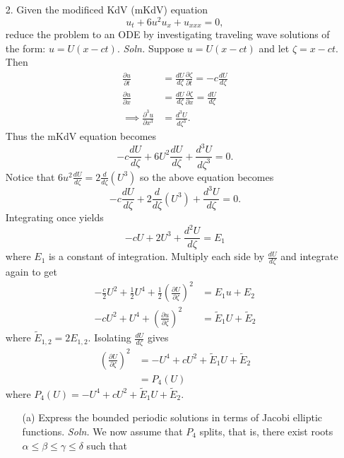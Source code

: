\documentclass{article}
\begin{document}
\begin{itemize}
    \item[2.] Given the modificed KdV (mKdV) equation
    \[u_t + 6u^2u_x + u_{xxx} = 0,\]
    reduce the problem to an ODE by investigating traveling wave solutions of the form: $u = U(x-ct)$.
    \newline\newline
    \textit{Soln.} Suppose $u = U(x-ct)$ and let $\zeta = x - ct$. Then
    \begin{align*}
        \frac{\partial u}{\partial t} &= \frac{dU}{d\zeta}\frac{\partial \zeta }{\partial t} = -c\frac{dU}{d\zeta}\\
        \frac{\partial u}{\partial x} &= \frac{dU}{d\zeta}\frac{\partial \zeta}{\partial x} = \frac{dU}{d\zeta}\\
        \implies \frac{\partial^3u}{\partial x^3} &= \frac{d^3U}{d\zeta^3}.
    \end{align*}
    Thus the mKdV equation becomes
    \[-c\frac{dU}{d\zeta} + 6U^2\frac{dU}{d\zeta} + \frac{d^3U}{d\zeta^3} = 0.\]
    Notice that $6u^2\frac{dU}{d\zeta} = 2\frac{d}{d\zeta}\left(U^3\right)$ so the above equation becomes
    \[-c\frac{dU}{d\zeta} + 2\frac{d}{d\zeta}\left(U^3\right) + \frac{d^3U}{d\zeta} = 0.\]
    Integrating once yields
    \[-cU + 2U^3 + \frac{d^2U}{d\zeta} = E_1\]
    where $E_1$ is a constant of integration. Multiply each side by $\frac{dU}{d\zeta}$ and integrate again to get
    \begin{align*}
        -\frac{c}{2}U^2 + \frac{1}{2}U^4 + \frac{1}{2}\left(\frac{\partial U}{\partial \zeta}\right)^2 &= E_1u + E_2\\
        -cU^2 + U^4 + \left(\frac{\partial u}{\partial \zeta}\right)^2 &= \tilde{E}_1U + \tilde{E}_2
    \end{align*}
    where $\tilde{E}_{1,2} = 2E_{1,2}$. Isolating $\frac{dU}{d\zeta}$ gives 
    \begin{align*}
        \left(\frac{\partial U}{\partial \zeta}\right)^2 &= -U^4 + cU^2 + \tilde{E}_1U + \tilde{E}_2\\
        &= P_4(U)
    \end{align*}
    where $P_4(U) = -U^4 + cU^2 + \tilde{E}_1U + \tilde{E}_2$.
    \begin{itemize}
        \item[(a)] Express the bounded periodic solutions in terms of Jacobi elliptic functions.
        \newline\newline
        \textit{Soln.} We now assume that $P_4$ splits, that is, there exist roots $\alpha \leq \beta \leq \gamma \leq \delta$ such that

\end{itemize}
\end{itemize}
\end{document}
